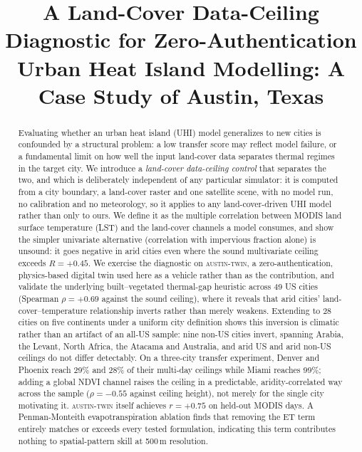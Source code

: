 \documentclass[conference]{IEEEtran}
\title{A Land-Cover Data-Ceiling Diagnostic for Zero-Authentication Urban
Heat Island Modelling: A Case Study of Austin, Texas}
\author{
\IEEEauthorblockN{Abhiram Donepudi}
\IEEEauthorblockA{Westwood High School, Round Rock, TX\\
\texttt{abhiram.donepudi@gmail.com}}
}
\begin{document}
\maketitle

\begin{abstract}
Evaluating whether an urban heat island (UHI) model generalizes to new
cities is confounded by a structural problem: a low transfer score may
reflect model failure, or a fundamental limit on how well the input
land-cover data separates thermal regimes in the target city. We introduce
a \emph{land-cover data-ceiling control} that separates the two, and which
is deliberately independent of any particular simulator: it is computed
from a city boundary, a land-cover raster and one satellite scene, with no
model run, no calibration and no meteorology, so it applies to any
land-cover-driven UHI model rather than only to ours. We define it as the
multiple correlation between MODIS land surface temperature (LST) and the
land-cover channels a model consumes, and show the simpler univariate
alternative (correlation with impervious fraction alone) is unsound: it
goes negative in arid cities even where the sound multivariate ceiling
exceeds $R{=}{+}0.45$. We exercise the diagnostic on
\textsc{austin-twin}, a zero-authentication, physics-based digital twin
used here as a vehicle rather than as the contribution,
and validate the underlying built--vegetated thermal-gap heuristic across
49 US cities (Spearman $\rho{=}{+}0.69$ against the sound ceiling), where
it reveals that arid cities' land-cover--temperature relationship inverts
rather than merely weakens. Extending to 28 cities on five continents under
a uniform city definition shows this inversion is climatic rather than an
artifact of an all-US sample: nine non-US cities invert, spanning Arabia,
the Levant, North Africa, the Atacama and Australia, and arid US and arid
non-US ceilings do not differ detectably. On a three-city transfer experiment,
Denver and Phoenix reach 29\% and 28\% of their multi-day ceilings while
Miami reaches 99\%; adding a global NDVI channel raises the ceiling in a
predictable, aridity-correlated way across the sample
($\rho{=}{-}0.55$ against ceiling height), not merely for the single city
motivating it. \textsc{austin-twin} itself achieves $r{=}{+}0.75$ on
held-out MODIS days. A Penman-Monteith evapotranspiration ablation finds
that removing the ET term entirely matches or exceeds every tested
formulation, indicating this term contributes nothing to spatial-pattern
skill at 500\,m resolution.
\end{abstract}
\end{document}
